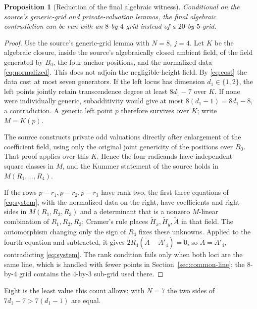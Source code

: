 \documentclass[11pt]{article}
\newtheorem{proposition}{Proposition}
\theoremstyle{remark}
\begin{document}
\begin{proposition}[Reduction of the final algebraic witness]
\label{prop:general}
Conditional on the source's generic-grid and private-valuation lemmas,
the final algebraic contradiction can be run with an $8$-by-$4$ grid
instead of a $20$-by-$5$ grid.
\end{proposition}
\begin{proof}
Use the source's generic-grid lemma with $N=8$, $j=4$. Let $K$ be the
algebraic closure, inside the source's algebraically closed ambient
field, of the field generated by $B_0$, the four anchor positions, and
the normalized data \eqref{eq:normalized}. This does not adjoin the
negligible-height field. By \eqref{eq:cost} the data cost at most seven
generators. If the left locus has dimension $d_1\in\{1,2\}$, the left
points jointly retain transcendence degree at least $8d_1-7$ over $K$.
If none were individually generic, subadditivity would give at most
$8(d_1-1)=8d_1-8$, a contradiction. A generic left point $p$ therefore
survives over $K$; write $M=K(p)$.

The source constructs private odd valuations directly after enlargement
of the coefficient field, using only the original joint genericity of
the positions over $B_0$. That proof applies over this $K$. Hence the
four radicands have independent square classes in $M$, and the Kummer
statement of the source holds in $M(R_1,\ldots,R_4)$.

If the rows $p-r_1,p-r_2,p-r_3$ have rank two, the first three
equations of \eqref{eq:system}, with the normalized data on the right,
have coefficients and right sides in $M(R_1,R_2,R_3)$ and a determinant
that is a nonzero $M$-linear combination of $R_1,R_2,R_3$; Cramer's rule
places $\widetilde H_x,\widetilde H_y,\widetilde A$ in that field. The
automorphism changing only the sign of $R_4$ fixes these unknowns.
Applied to the fourth equation and subtracted, it gives
$2R_4(\widetilde A-\widetilde A'_4)=0$, so
$\widetilde A=\widetilde A'_4$, contradicting \eqref{eq:system}.
The rank condition fails only when both loci are the same line, which
is handled with fewer points in Section~\ref{sec:common-line}; the
$8$-by-$4$ grid contains the $4$-by-$3$ sub-grid used there.
\end{proof}

Eight is the least value this count allows: with $N=7$ the two sides of
$7d_1-7>7(d_1-1)$ are equal.
\end{document}
